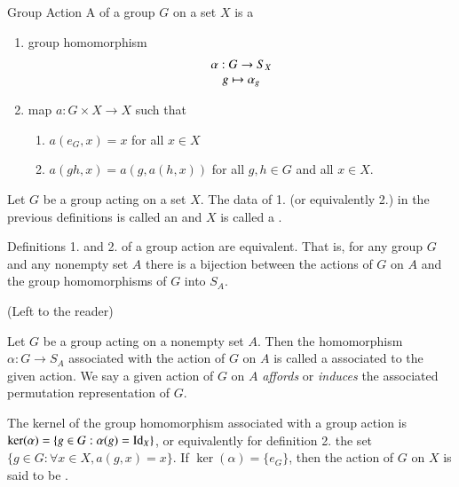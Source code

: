\documentclass[12pt, a4paper, twoside, openright, titlepage]{book}
\begin{document}
\begin{defn}{Group Action}{}
        A  of a group $G$ on a set $X$ is a \begin{enumerate}
                \item group homomorphism \begin{equation}
                                \begin{array}{c} \alpha:G\rightarrow S_X \\ g\mapsto \alpha_g \end{array}
                \end{equation}
                \item map $a:G\times X \rightarrow X$ such that \begin{enumerate}
                                \item $a(e_G,x) = x$ for all $x \in X$
                                \item $a(gh,x) = a(g,a(h,x))$ for all $g,h \in G$ and all $x \in X$.
                \end{enumerate}
        \end{enumerate}
\end{defn}

\begin{defn}{}{}
        Let $G$ be a group acting on a set $X$. The data of 1. (or equivalently 2.) in the previous definitions is called an  and $X$ is called a .
\end{defn}

\begin{claim}{}{}
        Definitions 1. and 2. of a group action are equivalent. That is, for any group $G$ and any nonempty set $A$ there is a bijection between the actions of $G$ on $A$ and the group homomorphisms of $G$ into $S_A$.
\end{claim}
\begin{proof*}{}{}
        (Left to the reader)
\end{proof*}


\begin{defn}{}{}
    Let $G$ be a group acting on a nonempty set $A$. Then the homomorphism $\alpha:G\rightarrow S_A$ associated with the action of $G$ on $A$ is called a  associated to the given action. We say a given action of $G$ on $A$ \emph{affords} or \emph{induces} the associated permutation representation of $G$.
\end{defn}


\begin{defn}{}{}
        The kernel of the group homomorphism associated with a group action is $\ker(\alpha) = \{g \in G:\alpha(g) = \operatorname{Id}_X\}$, or equivalently for definition 2. the set $\{g \in G: \forall x \in X, a(g,x) = x\}$. If $\ker(\alpha) = \{e_G\}$, then the action of $G$ on $X$ is said to be .
\end{defn}
\end{document}
